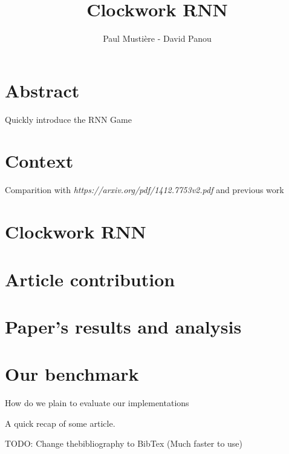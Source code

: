 \documentclass[a4paper,10pt]{article}
\title{Clockwork RNN}
\author{Paul Mustière - David Panou}
\begin{document}
\maketitle

\section{Abstract}

Quickly introduce the RNN Game

\section{Context}

Comparition with \textit{https://arxiv.org/pdf/1412.7753v2.pdf} and previous work

\section{Clockwork RNN}

\section{Article contribution}

\section{Paper's results and analysis}

\section{Our benchmark}

How do we plain to evaluate our implementations

A quick recap of some article.

TODO: Change thebibliography to BibTex (Much faster to use)
\end{document}
